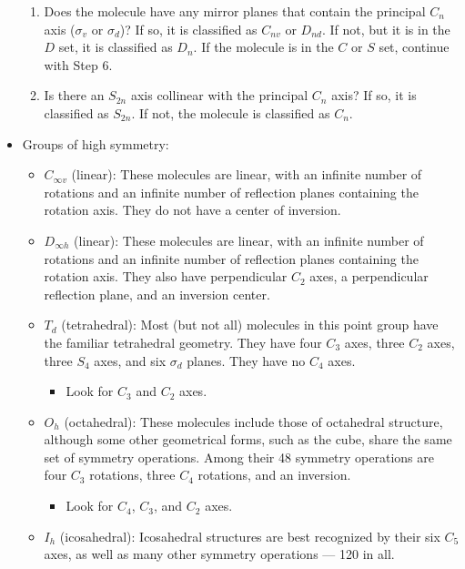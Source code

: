 \documentclass[../notes.tex]{subfiles}
\begin{document}
\begin{itemize}
\begin{enumerate}
        \item Does the molecule have any mirror planes that contain the principal $C_n$ axis ($\sigma_v$ or $\sigma_d$)? If so, it is classified as $C_{nv}$ or $D_{nd}$. If not, but it is in the $D$ set, it is classified as $D_n$. If the molecule is in the $C$ or $S$ set, continue with Step 6.
        \item Is there an $S_{2n}$ axis collinear with the principal $C_n$ axis? If so, it is classified as $S_{2n}$. If not, the molecule is classified as $C_n$.
    \end{enumerate}
    \item Groups of high symmetry:
    \begin{itemize}
        \item $C_{\infty v}$ (linear): These molecules are linear, with an infinite number of rotations and an infinite number of reflection planes containing the rotation axis. They do not have a center of inversion.
        \item $D_{\infty h}$ (linear): These molecules are linear, with an infinite number of rotations and an infinite number of reflection planes containing the rotation axis. They also have perpendicular $C_2$ axes, a perpendicular reflection plane, and an inversion center.
        \item $T_d$ (tetrahedral): Most (but not all) molecules in this point group have the familiar tetrahedral geometry. They have four $C_3$ axes, three $C_2$ axes, three $S_4$ axes, and six $\sigma_d$ planes. They have no $C_4$ axes.
        \begin{itemize}
            \item Look for $C_3$ and $C_2$ axes.
        \end{itemize}
        \item $O_h$ (octahedral): These molecules include those of octahedral structure, although some other geometrical forms, such as the cube, share the same set of symmetry operations. Among their 48 symmetry operations are four $C_3$ rotations, three $C_4$ rotations, and an inversion.
        \begin{itemize}
            \item Look for $C_4$, $C_3$, and $C_2$ axes.
        \end{itemize}
        \item $I_h$ (icosahedral): Icosahedral structures are best recognized by their six $C_5$ axes, as well as many other symmetry operations --- 120 in all.
        \begin{itemize}

\end{itemize}
\end{itemize}
\end{itemize}
\end{document}
